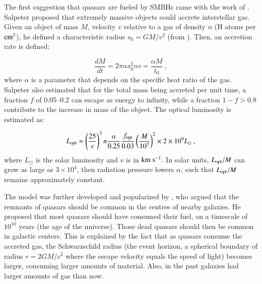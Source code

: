 The first suggestion that quasars are fueled by SMBHs came with the work of \citet{salpeter1965accretion}. Salpeter proposed that extremely massive objects could accrete interstellar gas. Given an object of mass $M$, velocity $v$ relative to a gas of density $n$ (H atoms per ${\rm cm}^3$), he defined a characteristic radius $s_0 = GM/v^2$ (from \citet{hoyle1939evolution}). Then, an accretion rate is defined:

\begin{equation}
	\frac{dM}{dt} = 2 \pi \alpha s_0^2 n v = \frac{\alpha M}{t_0}~,
	\label{eq:acc_hoyle}
\end{equation}
where $\alpha$ is a parameter that depends on the specific heat ratio of the gas. Salpeter also estimated that for the total mass being accreted per unit time, a fraction $f$ of 0.05--0.2 can escape as energy to infinity, while a fraction $1-f>0.8$ contribute to the increase in mass of the object. The optical luminosity is estimated as:

\begin{equation}
	L_{\rm opt} = \left(\frac{25}{v}\right)^{3} n \frac{\alpha}{0.25} \frac{f_{\rm opt}}{0.03} \left(\frac{M}{10^7}\right)^2 \times 2 \times 10^9 L_{\odot}~,
	\label{eq:lum_salpeter}
\end{equation}
where $L_{\odot}$ is the solar luminosity and $v$ is in ${\rm km}~{\rm s}^{-1}$. In solar units, $L_{\rm opt}/M$ can grow as large as $3 \times 10^4$, then radiation pressure lowers $\alpha$, such that $L_{\rm opt}/M$ remains approximately constant.

The model was further developed and popularized by \citet{lynden1969galactic}, who argued that the remnants of quasars should be common in the centres of nearby galaxies. He proposed that most quasars should have consumed their fuel, on a timescale of $10^{10}$ years (the age of the universe). Those dead quasars should then be common in galactic centers. This is explained by the fact that as quasars consume the accreted gas, the Schwarzschild radius (the event horizon, a spherical boundary of radius $r=2GM/c^2$ where the escape velocity equals the speed of light) becomes larger, consuming larger amounts of material. Also, in the past galaxies had larger amounts of gas than now.

